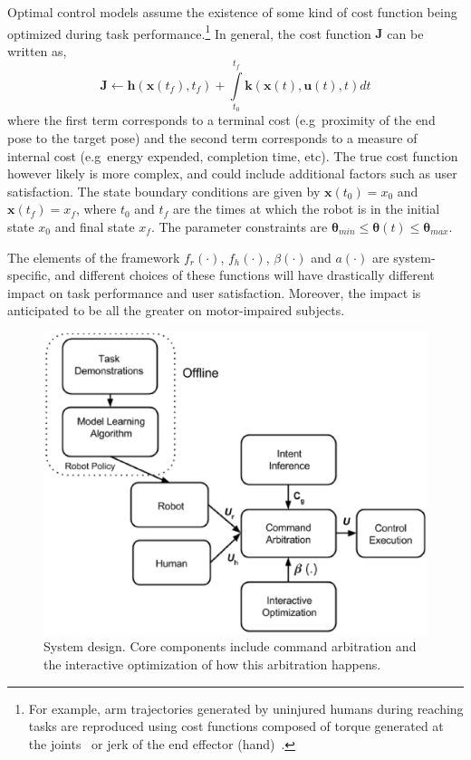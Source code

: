 \documentclass[letterpaper, 10 pt, journal, twoside]{IEEEtran}  %
\begin{document}
	Optimal control models assume the existence of some kind of cost function being optimized during task performance.\footnote{For example, arm trajectories generated by uninjured humans during reaching tasks are reproduced using cost functions composed of torque generated at the joints~\cite{uno1989formation} or jerk of the end effector (hand)~\cite{flash1985coordination}.} In general, the cost function $\boldsymbol{J}$ can be written as,  
	\begin{equation}
	\boldsymbol{J} \leftarrow \boldsymbol{h}(\boldsymbol{x}(t_f), t_f) + \int\limits_{t_0}^{t_f} \boldsymbol{k}(\boldsymbol{x}(t), \boldsymbol{u}(t), t)dt
	\end{equation}
	where the first term corresponds to a terminal cost (e.g~proximity of the end pose to the target pose) and the second term corresponds to a measure of internal cost (e.g~energy expended, completion time, etc). The true cost function however likely is more complex, and could include additional factors such as user satisfaction. The state boundary conditions are given by 
	$
	\boldsymbol{x}(t_0)	= x_0 
	$ and
	$
	\boldsymbol{x}(t_f) = x_f
	$,
	where $t_0$ and $t_f$ are the times at which the robot is in the initial state $x_0$ and final state $x_f$. 
	The parameter constraints are
	$
	\boldsymbol{\theta}_{min} \leq \boldsymbol{\theta}(t) \leq \boldsymbol{\theta}_{max}
	$.
	
	The elements of the framework $f_{r}(\cdot)$, $f_{h}(\cdot)$, $\beta(\cdot)$ and 
	$a(\cdot)$ are system-specific, and different choices of these functions will have drastically different impact on task performance and user satisfaction. Moreover, the impact is anticipated to be all the greater on motor-impaired subjects.
	\begin{figure}
		\begin{center}
			\includegraphics[width = 1\hsize]{./finalfigures/Figure1.eps}
			\vspace{-0.5cm}
			\caption{System design. Core components include command arbitration
				and the interactive optimization of how this arbitration happens.}
			\label{SD}
		\end{center}
	\end{figure}
\end{document}
